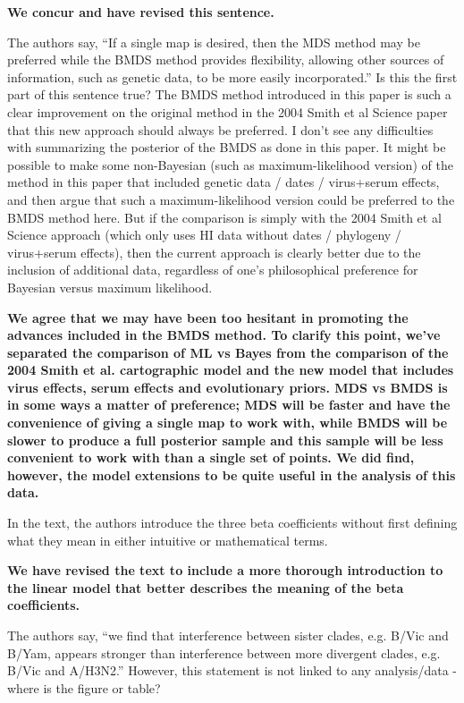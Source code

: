 \documentclass[11pt,oneside,letterpaper]{article}
\begin{document}
\textbf{We concur and have revised this sentence.}

The authors say, ``If a single map is desired, then the MDS method may be preferred while the BMDS method provides flexibility, allowing other sources of information, such as genetic data, to be more easily incorporated.'' Is this the first part of this sentence true? The BMDS method introduced in this paper is such a clear improvement on the original method in the 2004 Smith et al Science paper that this new approach should always be preferred. I don't see any difficulties with summarizing the posterior of the BMDS as done in this paper. It might be possible to make some non-Bayesian (such as maximum-likelihood version) of the method in this paper that included genetic data / dates / virus+serum effects, and then argue that such a maximum-likelihood version could be preferred to the BMDS method here. But if the comparison is simply with the 2004 Smith et al Science approach (which only uses HI data without dates / phylogeny / virus+serum effects), then the current approach is clearly better due to the inclusion of additional data, regardless of one's philosophical preference for Bayesian versus maximum likelihood.

\textbf{We agree that we may have been too hesitant in promoting the advances included in the BMDS method.  To clarify this point, we've separated the comparison of ML vs Bayes from the comparison of the 2004 Smith et al. cartographic model and the new model that includes virus effects, serum effects and evolutionary priors.  MDS vs BMDS is in some ways a matter of preference; MDS will be faster and have the convenience of giving a single map to work with, while BMDS will be slower to produce a full posterior sample and this sample will be less convenient to work with than a single set of points.  We did find, however, the model extensions to be quite useful in the analysis of this data.}

In the text, the authors introduce the three beta coefficients without first defining what they mean in either intuitive or mathematical terms.

\textbf{We have revised the text to include a more thorough introduction to the linear model that better describes the meaning of the beta coefficients.}

The authors say, ``we find that interference between sister clades, e.g. B/Vic and B/Yam, appears stronger than interference between more divergent clades, e.g. B/Vic and A/H3N2.'' However, this statement is not linked to any analysis/data - where is the figure or table?
\end{document}
